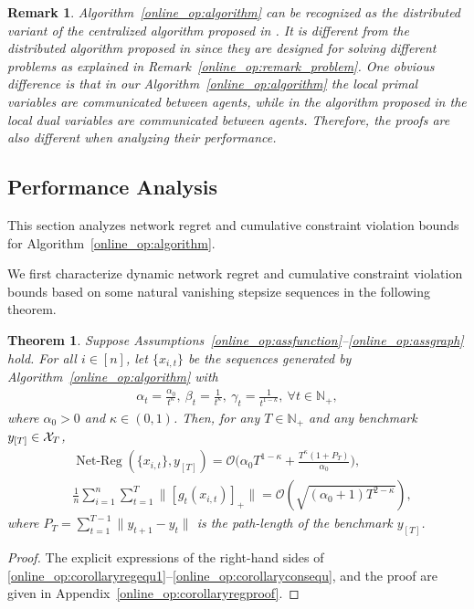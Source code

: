 \documentclass[12pt,draftcls,onecolumn]{IEEEtran}%
\newtheorem{theorem}{Theorem}
\newtheorem{remark}{Remark}
\DeclareMathOperator{\NetReg}{Net-Reg}
\begin{document}
\begin{remark}
	Algorithm~\ref{online_op:algorithm} can be recognized as the distributed variant of the centralized algorithm proposed in \cite{yu2017online,neely2017online}. It is different from the distributed algorithm proposed in \cite{yi2020distributed} since they are designed for solving different problems as explained in Remark~\ref{online_op:remark_problem}. One obvious difference is that in our Algorithm~\ref{online_op:algorithm} the local primal variables are communicated between agents, while in the algorithm proposed in \cite{yi2020distributed} the local dual variables are communicated between agents. Therefore, the proofs are also different when analyzing their performance.
\end{remark}





\subsection{Performance Analysis}
This section analyzes network regret and cumulative constraint violation bounds for Algorithm~\ref{online_op:algorithm}.

We first characterize dynamic network regret and cumulative constraint violation bounds based on some natural vanishing stepsize sequences in the following theorem.

\begin{theorem}\label{online_op:corollaryreg}
	Suppose Assumptions~\ref{online_op:assfunction}--\ref{online_op:assgraph} hold. For all $i\in[n]$, let $\{x_{i,t}\}$ be the sequences generated by Algorithm~\ref{online_op:algorithm} with
	\begin{align}\label{online_op:stepsize1}
		\alpha_t=\frac{\alpha_0}{t^{\kappa}},~\beta_t=\frac{1}{t^\kappa},
		~\gamma_t=\frac{1}{t^{1-k}},~\forall t\in\mathbb{N}_+,
	\end{align} where $\alpha_0>0$ and $\kappa\in(0,1)$. Then, for any $T\in\mathbb{N}_+$ and any benchmark $y_{[T]}\in{\mathcal{X}}_{T}$,
	\begin{align}
		&\NetReg(\{x_{i,t}\},y_{[T]})
		=\mathcal{O}\Big(\alpha_0 T^{1-\kappa}+\frac{T^\kappa(1+P_T)}{\alpha_0}\Big),\label{online_op:corollaryregequ1}\\
		&\frac{1}{n}\sum_{i=1}^n\sum_{t=1}^T\|[g_{t}(x_{i,t})]_+\|=
		\mathcal{O}(\sqrt{(\alpha_0+1)T^{2-\kappa}}),\label{online_op:corollaryconsequ}
	\end{align}
	where $P_T=\sum_{t=1}^{T-1}\|y_{t+1}-y_{t}\|$ is the path-length of the benchmark $y_{[T]}$.
\end{theorem}
\begin{proof}
	The explicit expressions of the right-hand sides of \eqref{online_op:corollaryregequ1}--\eqref{online_op:corollaryconsequ}, and the proof are given in  Appendix~\ref{online_op:corollaryregproof}.
\end{proof}
\end{document}
